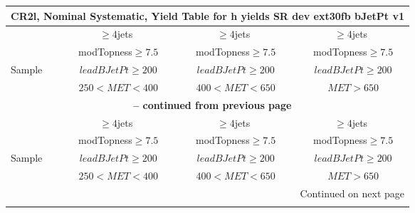 \documentclass{article}
\begin{document}
\begin{longtable}{|l|c|c|c|} 
 
\multicolumn{4}{c}{ CR2l, Nominal Systematic, Yield Table for h yields SR dev ext30fb bJetPt v1 }\\* \hline 
  & $\ge4$jets  & $\ge4$jets  & $\ge4$jets \\* 
  & ~modTopness$\ge7.5$  & ~modTopness$\ge7.5$  & ~modTopness$\ge7.5$ \\* 
Sample  & ~$leadBJetPt\ge200$  & ~$leadBJetPt\ge200$  & ~$leadBJetPt\ge200$ \\* 
  & ~$250<MET<400$  & ~$400<MET<650$  & ~$MET>650$ \\* 
\hline \hline 
\endfirsthead 
 
\multicolumn{4}{c}{{\bfseries \tablename\ \thetable{} -- continued from previous page}}\\* \hline 
  & $\ge4$jets  & $\ge4$jets  & $\ge4$jets \\* 
  & ~modTopness$\ge7.5$  & ~modTopness$\ge7.5$  & ~modTopness$\ge7.5$ \\* 
Sample  & ~$leadBJetPt\ge200$  & ~$leadBJetPt\ge200$  & ~$leadBJetPt\ge200$ \\* 
  & ~$250<MET<400$  & ~$400<MET<650$  & ~$MET>650$ \\* 
\hline \hline 
\endhead 
 
\multicolumn{4}{|r|}{{Continued on next page}}\\* \hline 
\endfoot 
 
 
\endlastfoot 
 

\end{longtable}
\end{document}
